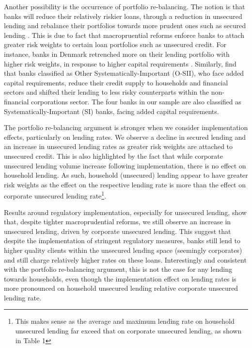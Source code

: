 \documentclass[
  letterpaper,
  DIV=11,
  numbers=noendperiod]{scrartcl}
\begin{document}
Another possibility is the occurrence of portfolio re-balancing. The
notion is that banks will reduce their relatively riskier loans, through
a reduction in unsecured lending and rebalance their portfolios towards
more prudent ones such as secured lending \citep{deli2017real}. This is
due to fact that macropruential reforms enforce banks to attach greater
risk weights to certain loan portfolios such as unsecured credit. For
instance, banks in Denmark retrenched more on their lending portfolio
with higher risk weights, in response to higher capital requirements
\citep{imbierowicz2018time}. Similarly, \cite{cappelletti2019impact}
find that banks classified as Other Systematically-Important (O-SII),
who face added capital requirements, reduce their credit supply to
households and financial sectors and shifted their lending to less risky
counterparts within the non-financial corporations sector. The four
banks in our sample are also classified as Systematically-Important (SI)
banks, facing added capital requirements.

The portfolio re-balancing argument is stronger when we consider
implementation effects, particularly on lending rates. We observe a
decline in secured lending and an increase in unsecured lending rates as
greater risk weights are attached to unsecured credit. This is also
highlighted by the fact that while corporate unsecured lending volume
increase following implementation, there is no effect on household
lending. As such, household (unsecured) lending appear to have greater
risk weights as the effect on the respective lending rate is more than
the effect on corporate unsecured lending
rate\footnote{This makes sense as the average and maximum lending rate on household unsecured lending far exceed that on corporate unsecured lending, as shown in Table 1}.

Results around regulatory implementation, especially for unsecured
lending, show that, despite tighter macroprudential reforms, we still
observe an increase in unsecured lending, driven by corporate unsecured
lending. This suggest that despite the implementation of stringent
regulatory measures, banks still lend to higher quality clients within
the unsecured lending space (seemingly corporates) and still charge
relatively higher rates on these loans. Interestingly and consistent
with the portfolio re-balancing argument, this is not the case for any
lending towards households, even though the implementation effect on
lending rates is more pronounced on household unsecured lending relative
corporate unsecured lending rate.
\end{document}
